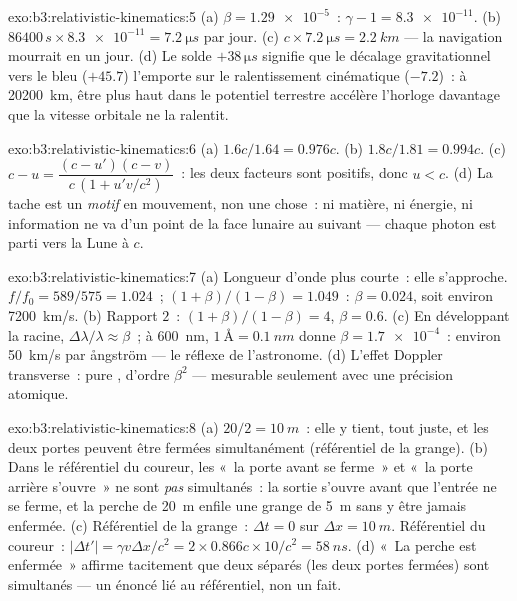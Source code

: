 \begin{solution}{exo:b3:relativistic-kinematics:5}
(a) $\beta = \num{1.29e-5}$~: $\gamma - 1 = \num{8.3e-11}$. (b)
$86400\,\unit{s} \times \num{8.3e-11} = \qty{7.2}{\micro s}$ par jour.
(c) $c \times \qty{7.2}{\micro s} = \qty{2.2}{km}$ --- la navigation
mourrait en un jour. (d) Le solde $+38\,\unit{\micro s}$ signifie que
le décalage gravitationnel vers le bleu ($+45.7$) l'emporte sur le
ralentissement cinématique ($-7.2$)~: à \qty{20200}{km}, être plus haut
dans le potentiel terrestre accélère l'horloge davantage que la vitesse
orbitale ne la ralentit.
\end{solution}

\begin{solution}{exo:b3:relativistic-kinematics:6}
(a) $1.6c/1.64 = 0.976c$. (b) $1.8c/1.81 = 0.994c$. (c) $c - u =
\dfrac{(c - u')(c - v)}{c\,(1 + u'v/c^2)}$~: les deux facteurs sont
positifs, donc $u < c$. (d) La tache est un \emph{motif} en mouvement,
non une chose~: ni matière, ni énergie, ni information ne va d'un point
de la face lunaire au suivant --- chaque photon est parti vers la Lune
à $c$.
\end{solution}

\begin{solution}{exo:b3:relativistic-kinematics:7}
(a) Longueur d'onde plus courte~: elle s'approche. $f/f_0 = 589/575 = 1.024$~;
$(1+\beta)/(1-\beta) = 1.049$~: $\beta = 0.024$, soit environ
\qty{7200}{km/s}. (b) Rapport $2$~: $(1+\beta)/(1-\beta) = 4$, $\beta =
0.6$. (c) En développant la racine, $\Delta\lambda/\lambda \approx
\beta$~; à \qty{600}{nm}, $\qty{1}{\angstrom} = \qty{0.1}{nm}$ donne
$\beta = \num{1.7e-4}$~: environ \qty{50}{km/s} par ångström --- le
réflexe de l'astronome. (d) L'effet Doppler transverse~: pure
, d'ordre $\beta^2$ --- mesurable seulement avec une
précision atomique.
\end{solution}

\begin{solution}{exo:b3:relativistic-kinematics:8}
(a) $20/2 = \qty{10}{m}$~: elle y tient, tout juste, et les deux portes
peuvent être fermées simultanément (référentiel de la grange). (b) Dans
le référentiel du coureur, les  «~la porte avant se ferme~»
et «~la porte arrière s'ouvre~» ne sont \emph{pas} simultanés~: la
sortie s'ouvre avant que l'entrée ne se ferme, et la perche de
\qty{20}{m} enfile une grange de \qty{5}{m} sans y être jamais
enfermée. (c) Référentiel de la grange~: $\Delta t = 0$ sur $\Delta x =
\qty{10}{m}$. Référentiel du coureur~: $|\Delta t'| = \gamma v\Delta x/c^2 =
2 \times 0.866c \times 10/c^2 = \qty{58}{ns}$. (d) «~La perche est
enfermée~» affirme tacitement que deux  séparés (les deux
portes fermées) sont simultanés --- un énoncé lié au référentiel, non
un fait.
\end{solution}

